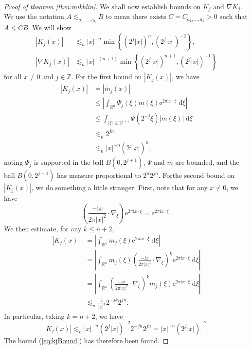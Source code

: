 \documentclass{book}
\newcommand{\bbR}{\mathbb{R}}
\newcommand{\bbZ}{\mathbb{Z}}
\renewcommand{\d}{\mathrm{d}}
\newcommand{\e}{\mathrm{e}}
\renewcommand{\i}{\mathrm{i}}
\newcommand{\abs}[1]{\left\lvert {#1} \right\rvert}
\newcommand{\set}[1]{\left\{ {#1} \right\}}
\newcommand{\parens}[1]{\left( {#1} \right)}
\theoremstyle{definition}
\theoremstyle{remark}
\numberwithin{equation}{chapter}
\begin{document}
\begin{proof}[Proof of theorem \ref{thm:mikhlin}]
    We shall now establish bounds on $K_j$ and $\nabla K_j$. We use the notation $A \lesssim_{a_1,\dots,a_k} B$ to mean there exists $C = C_{a_1,\dots,a_k} > 0$ such that $A \leq CB$. We will show 
    \begin{align}
        \abs{K_j(x)} &\lesssim_n \abs{x}^{-n} \min\set{ (2^j\abs{x})^n, (2^j\abs{x})^{-2} }, \label{eq:kjBound} \\
        \abs{\nabla K_j(x)} &\lesssim_n \abs{x}^{-(n+1)} \min\set{ (2^j\abs{x})^{n+1}, (2^j\abs{x})^{-1} } \label{eq:gradKjBound}
    \end{align}
    for all $x \neq 0$ and $j \in \bbZ$. For the first bound on $\abs{K_j(x)}$, we have 
    \begin{equation} \begin{aligned}
        \abs{K_j(x)}
        &= \abs{\check{m_j}(x)}  \\
        &\leq \abs{\int_{\bbR^n} \Psi_j(\xi) m(\xi) \e^{2\pi\i x \cdot \xi} \; \d{\xi}} \\
        &\leq \int_{\abs{\xi} \leq 2^{j+1}} \Psi(2^{-j} \xi) \abs{m(\xi)} \; \d{\xi} \\
        &\lesssim_n 2^{jn} \\
        &\lesssim_n \abs{x}^{-n} (2^j\abs{x})^n,
    \end{aligned} \end{equation}
    noting $\Psi_j$ is supported in the ball $B(0,2^{j+1})$, $\Psi$ and $m$ are bounded, and the ball $B(0,2^{j+1})$ has measure proportional to $2^n 2^{jn}$. Forthe second bound on $\abs{K_j(x)}$, we do something a little stranger. First, note that for any $x \neq 0$, we have 
    \begin{equation}
        \parens{ \frac{-\i x}{2\pi\abs{x}^2} \cdot \nabla_\xi } \e^{2\pi\i x \cdot \xi} = \e^{2\pi\i x \cdot \xi}.
    \end{equation}
    We then estimate, for any $k \leq n+2$,
    \begin{equation} \begin{aligned}
        \abs{K_j(x)}
        &= \abs{\int_{\bbR^n} m_j(\xi) \e^{2\pi\i x \cdot \xi} \; \d{\xi}} \\
        &= \abs{\int_{\bbR^n} m_j(\xi) \parens{ \frac{-\i x}{2\pi\abs{x}^2} \cdot \nabla_\xi }^k \e^{2\pi\i x \cdot \xi} \; \d{\xi} } \\
        &= \abs{\int_{\bbR^n} \parens{ \frac{-\i x}{2\pi\abs{x}^2} \cdot \nabla_\xi }^k m_j(\xi) \e^{2\pi\i x \cdot \xi} \; \d{\xi} } \\
        &\lesssim_n \frac{1}{\abs{x}^k} 2^{-jk} 2^{jn}.
    \end{aligned} \end{equation}
    In particular, taking $k = n + 2$, we have 
    \begin{equation}
        \abs{K_j(x)} \lesssim_n \abs{x}^{-n} (2^{j} \abs{x})^{-2} 2^{-jn} 2^{jn} = \abs{x}^{-n} (2^j \abs{x})^{-2}.
    \end{equation}
    The bound (\ref{eq:kjBound}) has therefore been found.


\end{proof}
\end{document}
